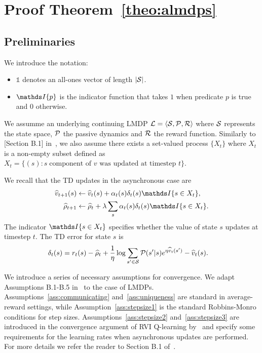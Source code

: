 \section{Proof Theorem~\ref{theo:almdps}}
\label{proof:theo_almdps}
\subsection{Preliminaries}
We introduce the notation:
\begin{itemize}
    \item $\mathds{1}$ denotes an all-ones vector of length $\lvert\mathcal{S}\rvert$.
    \item $\indicator{p}$ is the indicator function that takes $1$ when predicate $p$ is true and $0$ otherwise.
\end{itemize}

We assumme an underlying continuing LMDP $\mathcal{L}=\langle\mathcal{S},\mathcal{P},\mathcal{R}\rangle$ where $\mathcal{S}$ represents the state space, $\mathcal{P}$ the passive dynamics and $\mathcal{R}$ the reward function. Similarly to [Section B.1] in~\cite{Wan2021}, we also assume there exists a set-valued process $\{X_t\}$ where $X_t$ is a non-empty subset defined as ${X_t = \{ (s) : s\;\text{component of $v$ was updated at timestep $t$} \}}$.

We recall that the TD updates in the asynchronous case are 
\begin{align}
\widehat{v}_{t+1}(s) &\gets \widehat{v}_t(s) + \alpha_t(s) \delta_t(s) \indicator{s\in X_t},\label{eq:updatev}\\
\widehat{\rho}_{t+1} &\gets \widehat{\rho}_t + \lambda \sum_s \alpha_t(s) \delta_t(s) \indicator{s\in X_t}.\label{eq:updaterho}
\end{align}
The indicator $\indicator{s\in X_t}$ specifies whether the value of state $s$ updates at timestep $t$. The TD error for state $s$ is
\begin{align*}
\delta_t(s) %
 &= r_t(s) - \widehat{\rho}_t + \frac 1 \eta \log \sum_{s'\in\cS} \cP(s'|s) e^{\eta \widehat{v}_t(s')} - \widehat{v}_t(s).
\end{align*}

We introduce a series of necessary assumptions for convergence. We adapt Assumptions B.1-B.5 in~\cite{Wan2021} to the case of LMDPs. Assumptions~\ref{ass:communicating} and~\ref{ass:uniqueness} are standard in average-reward settings, while Assumption~\ref{ass:stepsize1} is the standard Robbins-Monro conditions for step sizes. Assumptions~\ref{ass:stepsize2} and~\ref{ass:stepsize3} are introduced in the convergence argument of RVI Q-learning by~\citet{Borkar1998} and specify some requirements for the learning rates when asynchronous updates are performed. For more details we refer the reader to Section B.1 of~\cite{Wan2021}.

